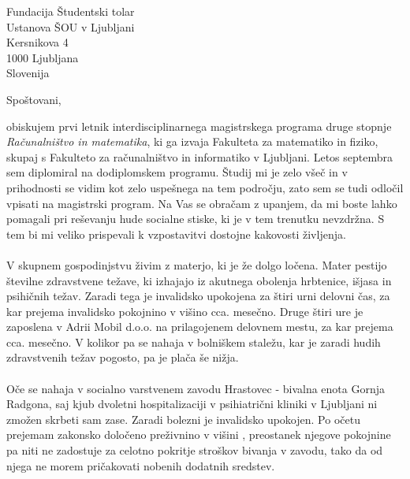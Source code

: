 \documentclass[a4paper]{scrlttr2}
\begin{document}
 
\begin{letter}{Fundacija Študentski tolar \\ Ustanova ŠOU v Ljubljani \\ Kersnikova 4 \\ 1000 Ljubljana \\ Slovenija}
 

\opening{Spoštovani,}
obiskujem prvi letnik interdisciplinarnega magistrskega programa druge stopnje \textit{Računalništvo in matematika}, ki ga izvaja Fakulteta za matematiko in fiziko, skupaj s Fakulteto za računalništvo in informatiko v Ljubljani. Letos septembra sem diplomiral na dodiplomskem programu. Študij mi je zelo všeč in v prihodnosti se vidim kot zelo uspešnega na tem področju, zato sem se tudi odločil vpisati na magistrski program. Na Vas se obračam z upanjem, da mi boste lahko pomagali pri reševanju hude socialne stiske, ki je v tem trenutku nevzdržna. S tem bi mi veliko prispevali k vzpostavitvi dostojne kakovosti življenja.
\\
\\
V skupnem gospodinjstvu živim z materjo, ki je že dolgo ločena. Mater pestijo številne zdravstvene težave, ki izhajajo iz akutnega obolenja hrbtenice, išjasa in psihičnih težav. Zaradi tega je invalidsko upokojena za štiri urni delovni čas, za kar prejema invalidsko pokojnino v višino cca.  mesečno. Druge štiri ure je zaposlena v Adrii Mobil d.o.o. na prilagojenem delovnem mestu, za kar prejema cca.  mesečno. V kolikor pa se nahaja v bolniškem staležu, kar je zaradi hudih zdravstvenih težav pogosto, pa je plača še nižja.
\\
\\
Oče se nahaja v socialno varstvenem zavodu Hrastovec - bivalna enota Gornja Radgona, saj kjub dvoletni hospitalizaciji v psihiatrični kliniki v Ljubljani ni zmožen skrbeti sam zase. Zaradi bolezni je invalidsko upokojen. Po očetu prejemam zakonsko določeno preživnino v višini , preostanek njegove pokojnine pa niti ne zadostuje za celotno pokritje stroškov bivanja v zavodu, tako da od njega ne morem pričakovati nobenih dodatnih sredstev.

\pagebreak


\end{letter}
\end{document}

